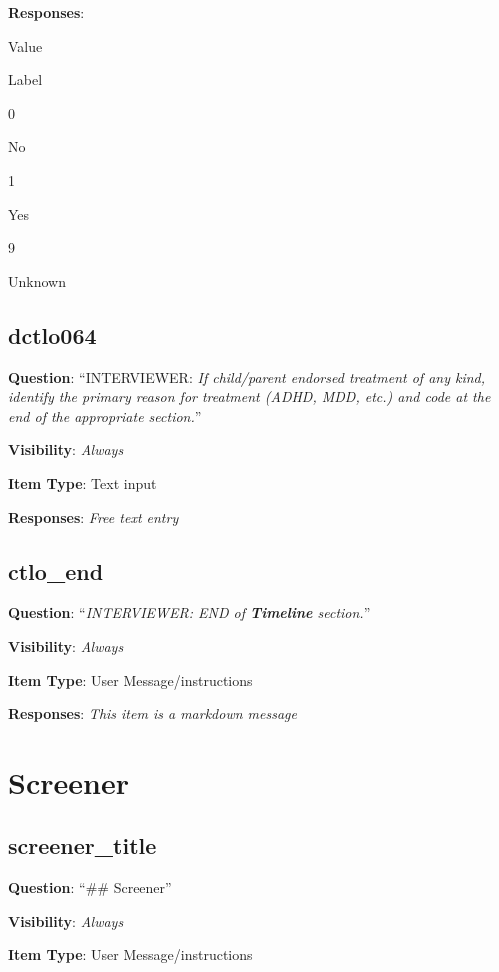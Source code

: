 \documentclass[]{book}
\begin{document}
\textbf{Responses}:

Value

Label

0

No

1

Yes

9

Unknown

\hypertarget{dctlo064}{%
\section{dctlo064}\label{dctlo064}}

\textbf{Question}: ``INTERVIEWER: \emph{If child/parent endorsed treatment of any kind, identify the primary reason for treatment (ADHD, MDD, etc.) and code at the end of the appropriate section.}''

\textbf{Visibility}: \emph{Always}

\textbf{Item Type}: Text input

\textbf{Responses}: \emph{Free text entry}

\hypertarget{ctlo_end}{%
\section{ctlo\_end}\label{ctlo_end}}

\textbf{Question}: ``\emph{INTERVIEWER: END of \textbf{Timeline} section.}''

\textbf{Visibility}: \emph{Always}

\textbf{Item Type}: User Message/instructions

\textbf{Responses}: \emph{This item is a markdown message}

\hypertarget{screener_section}{%
\chapter{Screener}\label{screener_section}}

\hypertarget{screener_title}{%
\section{screener\_title}\label{screener_title}}

\textbf{Question}: ``\#\# Screener''

\textbf{Visibility}: \emph{Always}

\textbf{Item Type}: User Message/instructions
\end{document}
